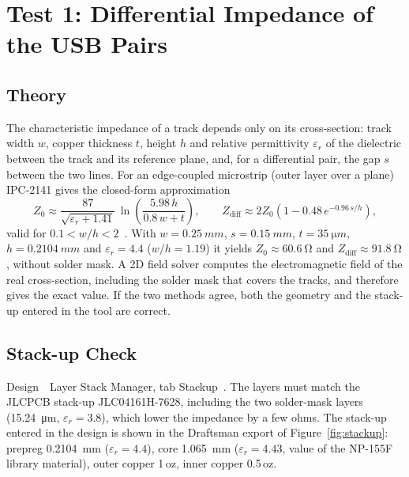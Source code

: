\documentclass[11pt,a4paper]{article}
\newcommand{\gui}[1]{\textsf{#1}}
\newcommand{\m}{\,\guillemotright\ }
\begin{document}
\section{Test 1: Differential Impedance of the USB Pairs}\label{sec:imp}

\subsection{Theory}

The characteristic impedance of a track depends only on its cross-section: track width $w$, copper
thickness $t$, height $h$ and relative permittivity $\varepsilon_r$ of the dielectric between the track and its
reference plane, and, for a differential pair, the gap $s$ between the two lines. For an edge-coupled
microstrip (outer layer over a plane) IPC-2141 gives the closed-form approximation
\begin{equation}
Z_0 \approx \frac{87}{\sqrt{\varepsilon_r + 1.41}}\,\ln\!\left(\frac{5.98\,h}{0.8\,w + t}\right), \qquad
Z_\text{diff} \approx 2 Z_0 \left(1 - 0.48\,e^{-0.96\,s/h}\right),
\end{equation}
valid for $0.1 < w/h < 2$~\cite{ipc2141}. With $w = \qty{0.25}{mm}$, $s = \qty{0.15}{mm}$, $t = \qty{35}{\micro m}$, $h = \qty{0.2104}{mm}$
and $\varepsilon_r = 4.4$ ($w/h = 1.19$) it yields $Z_0 \approx \qty{60.6}{\ohm}$ and $Z_\text{diff} \approx \qty{91.8}{\ohm}$, without solder mask. A
2D field solver computes the electromagnetic field of the real cross-section, including the solder
mask that covers the tracks, and therefore gives the exact value. If the two methods agree, both
the geometry and the stack-up entered in the tool are correct.

\subsection{Stack-up Check}

\gui{Design \m Layer Stack Manager}, tab \gui{Stackup}~\cite{altiumstack}. The layers must match the JLCPCB stack-up
JLC04161H-7628, including the two solder-mask layers (\qty{15.24}{\micro m}, $\varepsilon_r = 3.8$), which lower the
impedance by a few ohms. The stack-up entered in the design is shown in the Draftsman export
of Figure~\ref{fig:stackup}: prepreg \qty{0.2104}{mm} ($\varepsilon_r = 4.4$), core \qty{1.065}{mm} ($\varepsilon_r = 4.43$, value of the NP-155F
library material), outer copper 1\,oz, inner copper 0.5\,oz.
\end{document}
